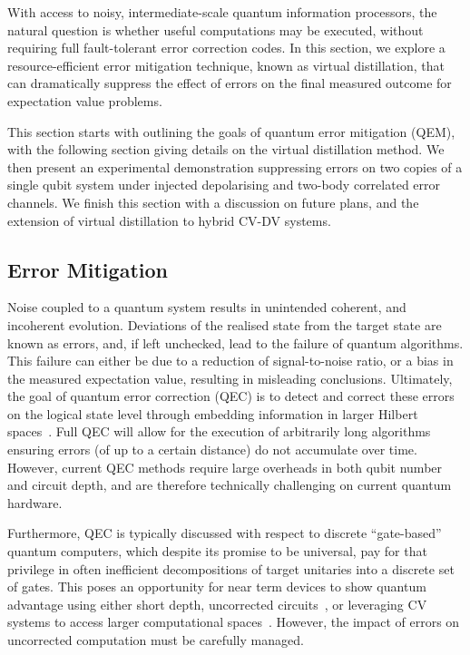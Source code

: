 With access to noisy, intermediate-scale quantum information processors, the
natural question is whether useful computations may be executed, without
requiring full fault-tolerant error correction codes. 
In this section, we explore a resource-efficient error mitigation technique, known
as virtual distillation, that can dramatically suppress the effect of errors on
the final measured outcome for expectation value problems.

This section starts with outlining the goals of quantum error mitigation (QEM),
with the following section giving details on the virtual distillation method. We
then present an experimental demonstration suppressing errors on two copies of a single qubit system under injected depolarising and two-body correlated error channels. 
We finish this section with a discussion on future plans, and the extension of virtual distillation to hybrid
CV-DV systems.

\subsection{Error Mitigation}
\label{sec:QEM}
Noise coupled to a quantum system results in unintended coherent, and incoherent
evolution. Deviations of the realised state from the target state are known as
errors, and, if left unchecked, lead to the failure of quantum algorithms. 
This failure can either be due to a reduction of signal-to-noise ratio, or a
bias in the measured expectation value, resulting in misleading conclusions. 
Ultimately, the goal of quantum error correction (QEC) is to detect and correct
these errors on the logical state level through embedding information in larger Hilbert spaces~\cite{terhal_quantum_2015}.
Full QEC will allow for the execution of arbitrarily long algorithms ensuring errors (of
up to a certain distance) do not accumulate over time. However, current QEC
methods require large overheads in both qubit number and circuit depth, and are
therefore technically challenging on current quantum hardware.

Furthermore, QEC is typically discussed with respect to
discrete ``gate-based'' quantum computers, which despite its promise
to be universal, pay for that privilege in often inefficient decompositions of
target unitaries into a discrete set of gates. 
This poses an opportunity for
near term devices to show quantum advantage using either short depth,
uncorrected circuits~\cite{preskill_quantum_2018}, or leveraging CV systems to access larger computational spaces~\cite{liu_hybrid_2026}. However, the impact of errors on uncorrected computation must be carefully managed.

